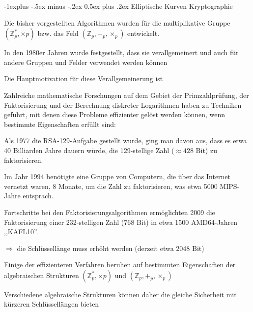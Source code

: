 \documentclass[a4paper]{article}
\makeatletter
\renewcommand{\subsection}{\@startsection{subsection}{2}{0mm}%
 {-1explus -.5ex minus -.2ex}%
 {0.5ex plus .2ex}%
 {\normalfont\normalsize\bfseries}}
\makeatother
\begin{document}
\begin{multicols}{3}
      \subsection{Elliptische Kurven Kryptographie}
      \begin{itemize*}
            \item Die bisher vorgestellten Algorithmen wurden für die multiplikative Gruppe $(\mathbb{Z}^*_p,\times p)$
            bzw. das Feld $(\mathbb{Z}_p, +_p, \times_p)$ entwickelt.
            \item In den 1980er Jahren wurde festgestellt, dass sie verallgemeinert und auch für andere Gruppen und Felder verwendet werden können
            \item Die Hauptmotivation für diese Verallgemeinerung ist
            \begin{itemize*}
                  \item Zahlreiche mathematische Forschungen auf dem Gebiet der Primzahlprüfung, der Faktorisierung und der Berechnung diskreter Logarithmen haben zu Techniken geführt, mit denen diese Probleme effizienter gelöst werden können, wenn bestimmte Eigenschaften erfüllt sind:
                  \begin{itemize*}
                        \item Als 1977 die RSA-129-Aufgabe gestellt wurde, ging man davon aus, dass es etwa 40 Billiarden Jahre dauern würde, die 129-stellige Zahl ($\approx 428$ Bit) zu faktorisieren.
                        \item Im Jahr 1994 benötigte eine Gruppe von Computern, die über das Internet vernetzt waren, 8 Monate, um die Zahl zu faktorisieren, was etwa 5000 MIPS-Jahre entsprach.
                        \item Fortschritte bei den Faktorisierungsalgorithmen ermöglichten 2009 die Faktorisierung einer 232-stelligen Zahl (768 Bit) in etwa 1500 AMD64-Jahren ,,KAFL10''.
                        \item $\Rightarrow$ die Schlüssellänge muss erhöht werden (derzeit etwa 2048 Bit)
                  \end{itemize*}
                  \item Einige der effizienteren Verfahren beruhen auf bestimmten Eigenschaften der algebraischen Strukturen $(\mathbb{Z}^*_p,\times p)$ und $(\mathbb{Z}_p, +_p, \times_p)$
                  \item Verschiedene algebraische Strukturen können daher die gleiche Sicherheit mit kürzeren Schlüssellängen bieten
            \end{itemize*}

\end{itemize*}
\end{multicols}
\end{document}
